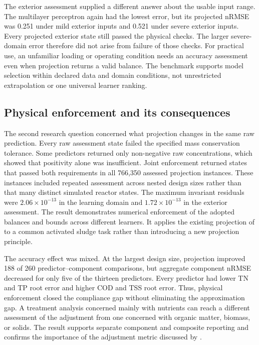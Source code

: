 The exterior assessment supplied a different answer about the usable input range. The multilayer perceptron again had the lowest error, but its projected nRMSE was 0.251 under mild exterior inputs and 0.521 under severe exterior inputs. Every projected exterior state still passed the physical checks. The larger severe-domain error therefore did not arise from failure of those checks. For practical use, an unfamiliar loading or operating condition needs an accuracy assessment even when projection returns a valid balance. The benchmark supports model selection within declared data and domain conditions, not unrestricted extrapolation or one universal learner ranking.

\subsection{Physical enforcement and its consequences}

The second research question concerned what projection changes in the same raw prediction. Every raw assessment state failed the specified mass conservation tolerance. Some predictors returned only non-negative raw concentrations, which showed that positivity alone was insufficient. Joint enforcement returned states that passed both requirements in all 766,350 assessed projection instances. These instances included repeated assessment across nested design sizes rather than that many distinct simulated reactor states. The maximum invariant residuals were $2.06\times10^{-13}$ in the learning domain and $1.72\times10^{-13}$ in the exterior assessment. The result demonstrates numerical enforcement of the adopted balances and bounds across different learners. It applies the existing projection of \citet{KircherVotsmeier2025} to a common activated sludge task rather than introducing a new projection principle.

The accuracy effect was mixed. At the largest design size, projection improved 188 of 260 predictor--component comparisons, but aggregate component nRMSE decreased for only five of the thirteen predictors. Every predictor had lower TN and TP root error and higher COD and TSS root error. Thus, physical enforcement closed the compliance gap without eliminating the approximation gap. A treatment analysis concerned mainly with nutrients can reach a different assessment of the adjustment from one concerned with organic matter, biomass, or solids. The result supports separate component and composite reporting and confirms the importance of the adjustment metric discussed by \citet{SturmSilva2024}.

